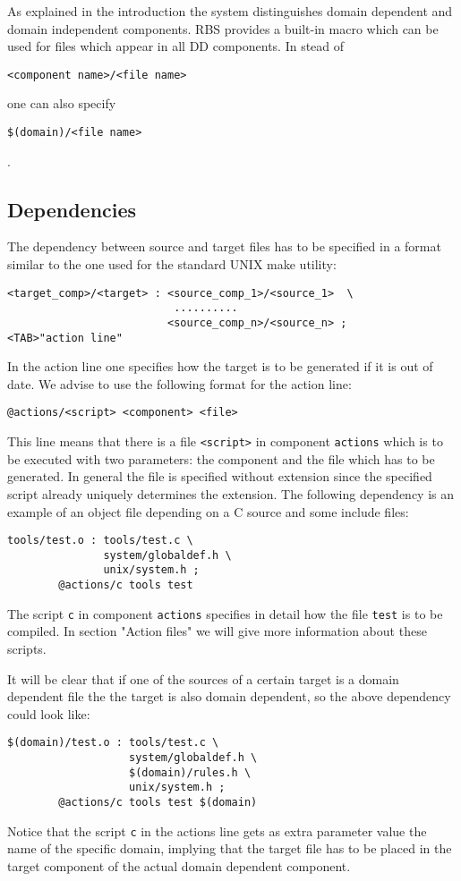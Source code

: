 As explained in the introduction the system distinguishes domain dependent and
domain independent components. RBS provides a built-in macro which can be
used for files which appear in all DD components. In stead of 
\begin{verbatim}
<component name>/<file name>
\end{verbatim}
 one can also specify 
\begin{verbatim}
$(domain)/<file name>
\end{verbatim} 
.
\subsection{Dependencies}

The dependency between source and target files has to be specified in a
format similar to the one used for the standard UNIX make utility:
\begin{verbatim}
<target_comp>/<target> : <source_comp_1>/<source_1>  \
                          ..........
                         <source_comp_n>/<source_n> ;
<TAB>"action line"
\end{verbatim}
In the action line one specifies how the target is to be generated if
it is out of date. We advise to use the following format for the action line:
\begin{verbatim}
@actions/<script> <component> <file>
\end{verbatim}
This line means that there is a file \verb+<script>+ in component 
\verb+actions+ which is
to be executed with two parameters: the component and the file which has to
be generated. In general the file is specified without extension since
the specified script already uniquely determines the extension.
The following dependency is an example of an object file depending on a C
source and some include files:
\begin{verbatim}
tools/test.o : tools/test.c \
               system/globaldef.h \
               unix/system.h ;
        @actions/c tools test 
\end{verbatim}
The script \verb+c+ in component \verb+actions+ specifies in detail how the 
file \verb+test+
is to be compiled. In section "Action files" we will give more
information about these scripts.

It will be clear that if one of the sources of a certain target is a domain
dependent file the the target is also domain dependent, so the above dependency
could look like:
\begin{verbatim}
$(domain)/test.o : tools/test.c \
                   system/globaldef.h \
                   $(domain)/rules.h \
                   unix/system.h ;
        @actions/c tools test $(domain)
\end{verbatim}
Notice that the script \verb+c+ in the actions line gets as extra parameter value
the name of the specific domain, implying that the target file has to be
placed in the target component of the actual domain dependent component.

